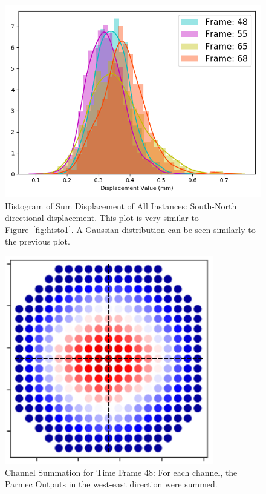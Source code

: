 \begin{figure}[p]
	\centering
	\includegraphics[scale=0.5]{Figures/histo2.png}
	\caption{Histogram of Sum Displacement of All Instances: South-North directional displacement. This plot is very similar to Figure~\ref{fig:histo1}. A Gaussian distribution can be seen similarly to the previous plot.}
	\label{fig:histo2}
\end{figure}

\begin{figure}[ht]
	\centering
	\includegraphics[scale=0.85]{Figures/compositeLines.png}
	\caption{Channel Summation for Time Frame 48: For each channel, the Parmec Outputs in the west-east direction were summed.}
	\label{fig:composite}
\end{figure}

